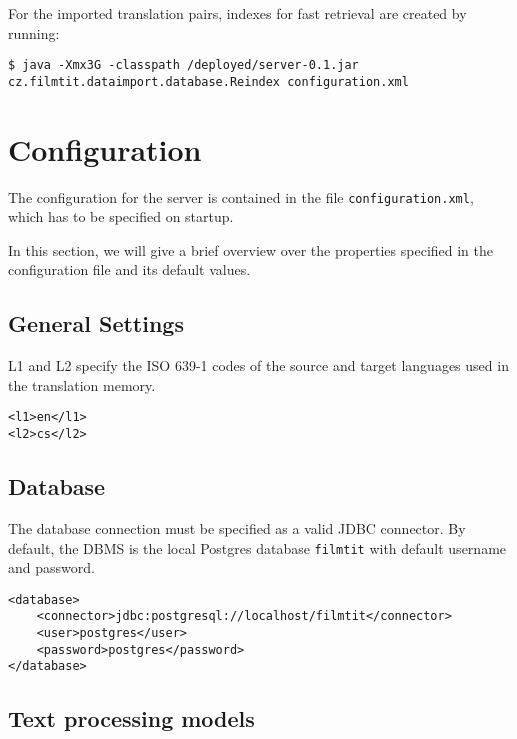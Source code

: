 For the imported translation pairs, indexes for fast retrieval are created by running:

\vspace*{0.5em}
\begin{lstlisting}
$ java -Xmx3G -classpath /deployed/server-0.1.jar cz.filmtit.dataimport.database.Reindex configuration.xml
\end{lstlisting}
\vspace*{0.5em}




\section{Configuration}
\label{sec:config}

The configuration for the server is contained in the file \verb#configuration.xml#, which has to be specified on startup.

In this section, we will give a brief overview over the properties specified in the configuration file and its default values.

\subsection{General Settings}
L1 and L2 specify the ISO 639-1 codes of the source and target languages used in the translation memory.
\begin{lstlisting}
<l1>en</l1>
<l2>cs</l2>
\end{lstlisting}

\subsection{Database}

The database connection must be specified as a valid JDBC connector. By default, the DBMS is the local Postgres database \verb#filmtit# with default username and password.

\begin{lstlisting}
<database>
    <connector>jdbc:postgresql://localhost/filmtit</connector>
    <user>postgres</user>
    <password>postgres</password>
</database>
\end{lstlisting}

\subsection{Text processing models}

